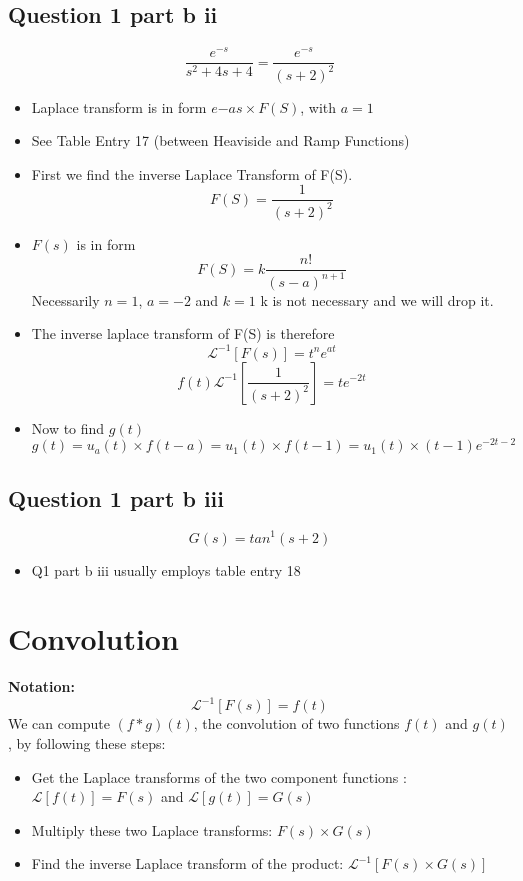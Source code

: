 \documentclass[11pt,a4paper,titlepage,oneside,openany]{article}
\numberwithin{equation}{section}
\numberwithin{algorithm}{section}
\numberwithin{figure}{section}
\numberwithin{table}{section}
\begin{document}
\subsection*{Question 1 part b ii}
\[\frac{e^{-s}}{s^2 + 4s + 4}= \frac{e^{-s}}{(s+2)^2}  \]

\begin{itemize}
\item Laplace transform is in form $e{-as} \times F(S)$, with $a =1$
\item See Table Entry 17 (between Heaviside and Ramp Functions)
\item First we find the inverse Laplace Transform of F(S).
\[F(S) = \frac{1}{(s+2)^2}  \]
\item $F(s)$ is in form
\[F(S) = k \frac{n!}{(s-a)^{n+1}}  \]
Necessarily $n=1$, $a=-2$ and $k=1$ k is not necessary and we will drop it.
\item The inverse laplace transform of F(S) is therefore
\[ \mathcal{L}^{-1}[F(s)] = t^n e^{at}\]
\[ f(t) \mathcal{L}^{-1}[\frac{1}{(s+2)^2}] = t e^{-2t}\]
\item Now to find $g(t)$
\[g(t) = u_a(t)\times f(t-a)= u_1(t)\times f(t-1) = u_1(t)\times (t-1) e^{-2t-2}\]
\end{itemize}

\subsection*{Question 1 part b iii}
\[ G(s) = tan^1(s+2)\]
\begin{itemize}
\item Q1 part b iii usually employs table entry 18
\end{itemize}

\newpage

\section*{Convolution}
\textbf{Notation:}
\[
\mathcal{L}^{-1} [F(s)] = f(t) \]
We can compute $ (f * g )(t)$, the convolution of two functions $f(t)$ and $g(t)$, by following these steps:\\
\bigskip
\begin{itemize}
\item Get the Laplace transforms of the two component functions : $\mathcal{L}[f(t)] = F(s)$ and $\mathcal{L}[g(t)] = G(s)$
\item Multiply these two Laplace transforms: $ F(s) \times G(s)$
\item Find the inverse Laplace transform of the product: $\mathcal{L}^{-1}[F(s) \times G(s)] $
\end{itemize}
\newpage
\end{document}
